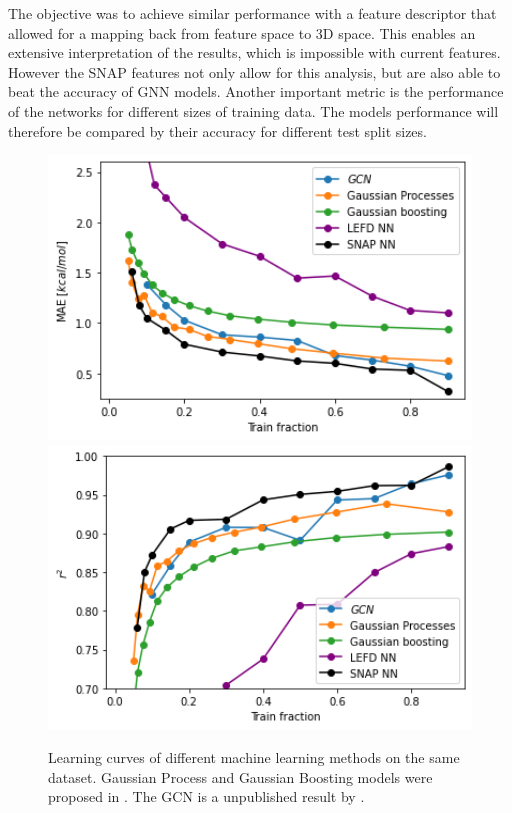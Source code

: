 The objective was to achieve similar performance with a feature descriptor that allowed for a mapping back from feature space to 3D space.
This enables an extensive interpretation of the results, which is impossible with current features.
However the SNAP features not only allow for this analysis, but are also able to beat the accuracy of GNN models.
Another important metric is the performance of the networks for different sizes of training data.
The models performance will therefore be compared by their accuracy for different test split sizes.
\\
\begin{figure}[H]
    \includegraphics[width=1.0\textwidth]{figures/regression/mae-compare.png}
  \endminipage\hfill
  \includegraphics[width=1.0\textwidth]{figures/regression/r2-compare.png}
  \endminipage\hfill  
  \caption[Comparison of learning curves]{
    Learning curves of different machine learning methods on the same dataset.
    Gaussian Process and Gaussian Boosting models were proposed in \cite{friederich_dos}.
    The GCN is a unpublished result by \citeauthor{friederich_dos}.
  }
  \label{fig:comparison}

\end{figure}

